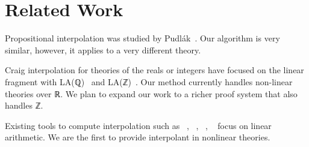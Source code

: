\section{Related Work}
\label{sec:related}

Propositional interpolation was studied by Pudl{\'a}k~\cite{MR1472134}.
Our algorithm is very similar, however, it applies to a very different theory.

Craig interpolation for theories of the reals or integers have focused on the 
linear fragment with LA(ℚ)~\cite{DBLP:conf/tacas/McMillan04,DBLP:conf/vmcai/RybalchenkoS07} and LA(ℤ)~\cite{DBLP:conf/cade/BrilloutKRW10,DBLP:conf/tacas/GriggioLS11}.
Our method currently handles non-linear theories over ℝ.
We plan to expand our work to a richer proof system that also handles ℤ.

Existing tools to compute interpolation such as
\smtinterpol~\cite{DBLP:conf/spin/ChristHN12},
\princess~\cite{DBLP:conf/cade/BrilloutKRW10},
\zthree~\cite{DBLP:conf/fmcad/McMillan11},
\mathsat~\cite{mathsat5} focus on linear arithmetic.
We are the first to provide interpolant in nonlinear theories.

